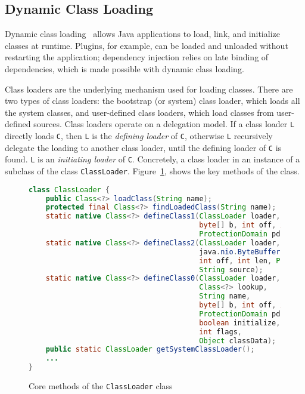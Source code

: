 \subsection{Dynamic Class Loading}\label{dynamic_class_loading}
Dynamic class loading~\cite{liang_dynamic_1998} allows Java applications to load, link, and initialize classes at runtime. Plugins, for example, can be loaded and unloaded without restarting the application; dependency injection relies on late binding of dependencies, which is made possible with dynamic class loading. 

Class loaders are the underlying mechanism used for loading classes. 
There are two types of class loaders: the bootstrap (or system) class loader, which loads all the system classes, and user-defined class loaders, which load classes from user-defined sources.
Class loaders operate on a delegation model. If a class loader \verb|L| directly loads \verb|C|, then \verb|L| is the \emph{defining loader} of \verb|C|, otherwise \verb|L| recursively delegate the loading to another class loader, until the defining loader of \verb|C| is found. \verb|L| is an \emph{initiating loader} of \verb|C|. Concretely, a class loader in an instance of a subclass of the class \verb|ClassLoader|. 
Figure~\ref{fig:classloader}, shows the key methods of the class.

\begin{figure}[ht]
    \centering
\begin{lstlisting}[language=Java]
class ClassLoader {
    public Class<?> loadClass(String name);
    protected final Class<?> findLoadedClass(String name);
    static native Class<?> defineClass1(ClassLoader loader, String name, 
                                        byte[] b, int off, int len,
                                        ProtectionDomain pd, String source);
    static native Class<?> defineClass2(ClassLoader loader, String name, 
                                        java.nio.ByteBuffer b,
                                        int off, int len, ProtectionDomain pd,
                                        String source);
    static native Class<?> defineClass0(ClassLoader loader,
                                        Class<?> lookup,
                                        String name,
                                        byte[] b, int off, int len,
                                        ProtectionDomain pd,
                                        boolean initialize,
                                        int flags,
                                        Object classData);
    public static ClassLoader getSystemClassLoader();
    ...
}
\end{lstlisting}
    \caption{Core methods of the \texttt{ClassLoader} class}
    \label{fig:classloader}
\end{figure}


